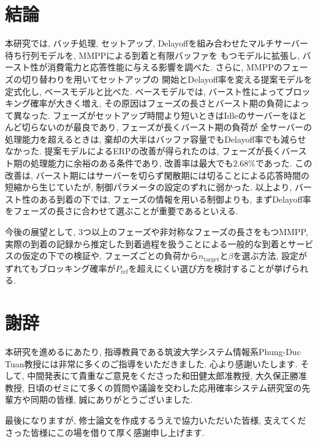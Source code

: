 \documentclass[a4paper, 11pt, dvipdfmx]{jsreport}
\begin{document}

\chapter{結論}
\label{chap:conclusion}

本研究では, バッチ処理, セットアップ, Delayoffを組み合わせたマルチサーバー待ち行列モデルを, MMPPによる到着と有限バッファを
もつモデルに拡張し, バースト性が消費電力と応答性能に与える影響を調べた. さらに, MMPPのフェーズの切り替わりを用いてセットアップの
開始とDelayoff率を変える提案モデルを定式化し, ベースモデルと比べた.
ベースモデルでは, バースト性によってブロッキング確率が大きく増え, その原因はフェーズの長さとバースト期の負荷によって異なった.
フェーズがセットアップ時間より短いときはIdleのサーバーをほとんど切らないのが最良であり, フェーズが長くバースト期の負荷が
全サーバーの処理能力を超えるときは, 棄却の大半はバッファ容量でもDelayoff率でも減らせなかった.
提案モデルによるERPの改善が得られたのは, フェーズが長くバースト期の処理能力に余裕のある条件であり, 改善率は最大でも$2.68\%$であった.
この改善は, バースト期にはサーバーを切らず閑散期には切ることによる応答時間の短縮から生じていたが, 制御パラメータの設定のずれに弱かった.
以上より, バースト性のある到着の下では, フェーズの情報を用いる制御よりも, まずDelayoff率をフェーズの長さに合わせて選ぶことが重要であるといえる.


今後の展望として, 3つ以上のフェーズや非対称なフェーズの長さをもつMMPP, 実際の到着の記録から推定した到着過程を扱うことによる一般的な到着とサービスの仮定の下での検証や, フェーズごとの負荷から$n_{\mathrm{target}}$と$\beta$を選ぶ方法, 設定がずれてもブロッキング確率が$P_{\mathrm{ref}}$を超えにくい選び方を検討することが挙げられる.

\chapter*{謝辞}
\label{chap:acknowledge}
本研究を進めるにあたり, 指導教員である筑波大学システム情報系Phung-Duc Tuan教授には非常に多くのご指導をいただきました. 心より感謝いたします.
そして, 中間発表にて貴重なご意見をくださった和田健太郎准教授, 大久保正勝准教授, 日頃のゼミにて多くの質問や議論を交わした応用確率システム研究室の先輩方や同期の皆様, 誠にありがとうございました.

最後になりますが, 修士論文を作成するうえで協力いただいた皆様, 支えてくださった皆様にこの場を借りて厚く感謝申し上げます.
\end{document}
